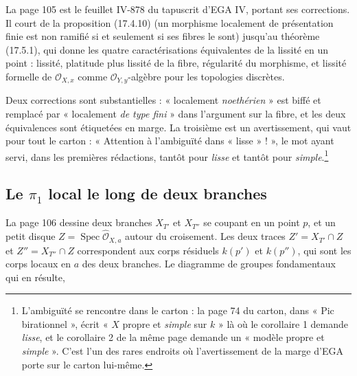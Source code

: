 \documentclass[11pt,a4paper]{article}
\begin{document}
La page 105 est le feuillet IV-878 du tapuscrit d'EGA IV, portant ses
corrections. Il court de la proposition (17.4.10) (un morphisme localement
de présentation finie est non ramifié si et seulement si ses fibres le sont)
jusqu'au théorème (17.5.1), qui donne les quatre caractérisations équivalentes
de la lissité en un point : lissité, platitude plus lissité de la fibre,
régularité du morphisme, et lissité formelle de
$\mathcal{O}_{X,x}$ comme $\mathcal{O}_{Y,y}$-algèbre pour les topologies
discrètes.

Deux corrections sont substantielles : « localement \emph{noethérien} » est
biffé et remplacé par « localement \emph{de type fini} » dans l'argument sur la
fibre, et les deux équivalences sont étiquetées en marge. La troisième est un
avertissement, qui vaut pour tout le carton : « Attention à l'ambiguïté dans
« lisse » ! », le mot ayant servi, dans les premières rédactions, tantôt
pour \emph{lisse} et tantôt pour \emph{simple}.\footnote{L'ambiguïté se
rencontre dans le carton : la page 74 du carton, dans « Pic birationnel », écrit
« $X$ propre et \emph{simple} sur $k$ » là où le corollaire 1 demande
\emph{lisse}, et le corollaire 2 de la même page demande un « modèle propre et
\emph{simple} ». C'est l'un des rares endroits où l'avertissement de la marge
d'EGA porte sur le carton lui-même.}

\subsection*{Le $\pi_{1}$ local le long de deux branches}

La page 106 dessine deux branches $X_{T'}$ et $X_{T''}$ se coupant en un point
$p$, et un petit disque $Z = \operatorname{Spec}
\hat{\mathcal{O}}_{X,a}$ autour du croisement. Les deux traces
$Z' = X_{T'} \cap Z$ et $Z'' = X_{T''} \cap Z$ correspondent aux corps
résiduels $k(p')$ et $k(p'')$, qui sont les corps locaux en $a$ des deux
branches. Le diagramme de groupes fondamentaux qui en résulte,

\end{document}
